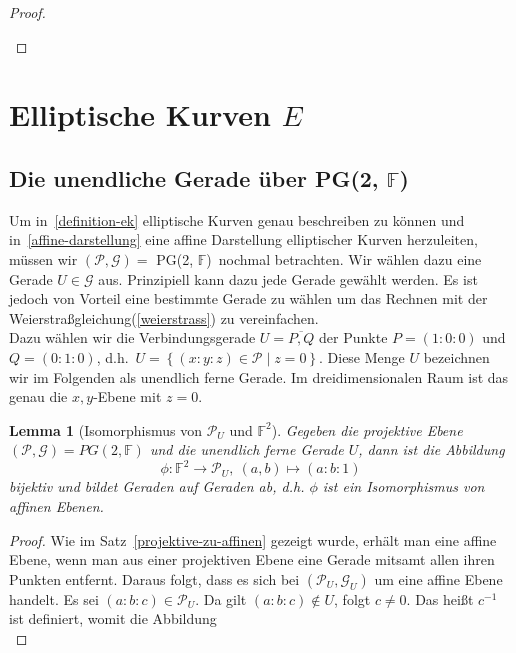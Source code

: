 \documentclass[hidelinks]{article}
\theoremstyle{plain}
\newtheorem{lem}[thm]{Lemma}
\theoremstyle{definition}
\theoremstyle{rem}
\newcommand{\pgtwo}{PG(2, $\mathbb{F}$)\ }
\newcommand{\pu}{\mathcal{P}_U}
\begin{document}
\begin{sloppypar}
\begin{proof}
\begin{enumerate}
\end{enumerate}
\end{proof}
\section{Elliptische Kurven $E$}
\subsection{Die unendliche Gerade über \pgtwo}
Um in~\ref{definition-ek} elliptische Kurven genau beschreiben zu können und in~\ref{affine-darstellung} eine affine Darstellung elliptischer Kurven herzuleiten, müssen wir $(\mathcal{P,G}) =$ \pgtwo nochmal betrachten.
Wir wählen dazu eine Gerade $U \in \mathcal{G}$ aus. 
Prinzipiell kann dazu jede Gerade gewählt werden. 
Es ist jedoch von Vorteil eine bestimmte Gerade zu wählen um das Rechnen mit der Weierstraßgleichung(\ref{weierstrass}) zu vereinfachen. \\
\newline
Dazu wählen wir die Verbindungsgerade $U = \overline{P,Q}$ der Punkte $P = (1:0:0)$ und $Q = (0:1:0)$, d.h.\ $U = \left\{ (x:y:z) \in \mathcal{P} \mid z = 0 \right\}$. 
Diese Menge $U$ bezeichnen wir im Folgenden als unendlich ferne Gerade.
Im dreidimensionalen Raum ist das genau die $x,y$-Ebene mit $z=0$. \\ 
\begin{lem}[Isomorphismus von $\pu$ und $\mathbb{F}^2$]
    Gegeben die projektive Ebene $(\mathcal{P}, \mathcal{G}) = PG(2,\mathbb{F})$ und die unendlich ferne Gerade $U$, dann ist die Abbildung
    \begin{equation*}
        \phi: \mathbb{F}^2 \rightarrow \mathcal{P}_U,\ (a,b) \mapsto (a:b:1)
    \end{equation*}
    bijektiv und bildet Geraden auf Geraden ab, d.h. $\phi$ ist ein Isomorphismus von affinen Ebenen. 
\end{lem}
\begin{proof} \label{isomorphismus-lemma}
    Wie im Satz~\ref{projektive-zu-affinen} gezeigt wurde, erhält man eine affine Ebene, wenn man aus einer projektiven Ebene eine Gerade mitsamt allen ihren Punkten entfernt. Daraus folgt, dass es sich bei $(\mathcal{P}_U, \mathcal{G}_U)$ um eine affine Ebene handelt. Es sei $(a:b:c) \in \mathcal{P}_U$. Da gilt $(a:b:c) \notin U$, folgt $c \neq 0$. Das heißt $c^{-1}$ ist definiert, womit die Abbildung
    \begin{equation*}

\end{equation*}
\end{proof}
\end{sloppypar}
\end{document}
